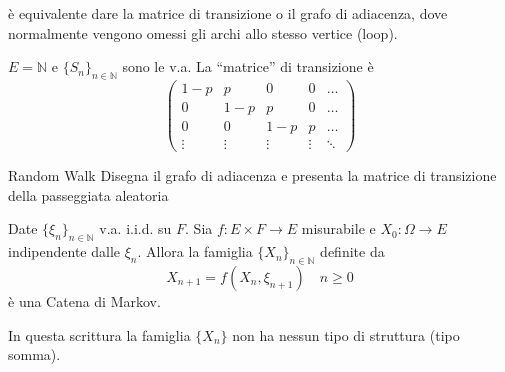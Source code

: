 è equivalente dare la matrice di transizione o il grafo di adiacenza, dove
normalmente vengono omessi gli archi allo stesso vertice (loop).

\begin{example}
    \(E = \mathbb{N}\) e \(\{S_{n}\}_{n \in \mathbb{N}} \) sono le v.a. La
    ``matrice'' di transizione è
    \[
      \begin{pmatrix}
          1-p & p & 0 & 0 & \dots \\
          0 & 1-p & p & 0 & \dots \\
          0 & 0 & 1-p & p & \dots \\
          \vdots & \vdots & \vdots & \vdots & \ddots
      \end{pmatrix}
    \]
\end{example}

\begin{eser}{Random Walk}
    Disegna il grafo di adiacenza e presenta la matrice di transizione della
    passeggiata aleatoria
\end{eser}

\begin{proposition}{}
    Date \(\{\xi_{n} \} _{n \in \mathbb{N}} \) v.a. i.i.d. su \(F\). Sia \(f : E
    \times F \to E\) misurabile e \(X_{0} : \Omega \to E\) indipendente dalle
    \(\xi_n\). Allora la famiglia \(\{X_{n}\} _{n \in \mathbb{N}} \) definite da 
    \[
        X_{n+1} = f{(X_{n}, \xi_{n+1} )} \quad n \ge  0
    \]
    è una Catena di Markov.
\end{proposition}

\begin{remark}{}
    In questa scrittura la famiglia \(\{X_{n}\} \) non ha nessun tipo di
    struttura (tipo somma).
\end{remark}


